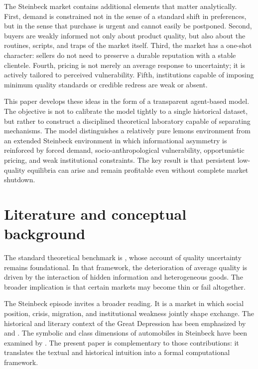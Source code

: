 \documentclass[12pt]{article}
\begin{document}
The Steinbeck market contains additional elements that matter analytically. First, demand is constrained not in the sense of a standard shift in preferences, but in the sense that purchase is urgent and cannot easily be postponed. Second, buyers are weakly informed not only about product quality, but also about the routines, scripts, and traps of the market itself. Third, the market has a one-shot character: sellers do not need to preserve a durable reputation with a stable clientele. Fourth, pricing is not merely an average response to uncertainty; it is actively tailored to perceived vulnerability. Fifth, institutions capable of imposing minimum quality standards or credible redress are weak or absent.

This paper develops these ideas in the form of a transparent agent-based model. The objective is not to calibrate the model tightly to a single historical dataset, but rather to construct a disciplined theoretical laboratory capable of separating mechanisms. The model distinguishes a relatively pure lemons environment from an extended Steinbeck environment in which informational asymmetry is reinforced by forced demand, socio-anthropological vulnerability, opportunistic pricing, and weak institutional constraints. The key result is that persistent low-quality equilibria can arise and remain profitable even without complete market shutdown.

\section{Literature and conceptual background}

The standard theoretical benchmark is \citet{akerlof1970}, whose account of quality uncertainty remains foundational. In that framework, the deterioration of average quality is driven by the interaction of hidden information and heterogeneous goods. The broader implication is that certain markets may become thin or fail altogether.

The Steinbeck episode invites a broader reading. It is a market in which social position, crisis, migration, and institutional weakness jointly shape exchange. The historical and literary context of the Great Depression has been emphasized by \citet{dickstein2004} and \citet{dyen2010}. The symbolic and class dimensions of automobiles in Steinbeck have been examined by \citet{delucia2014}. The present paper is complementary to those contributions: it translates the textual and historical intuition into a formal computational framework.
\end{document}
